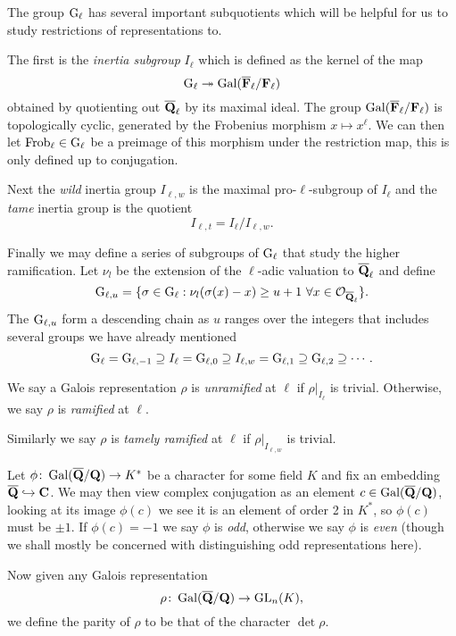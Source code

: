 \documentclass[a4paper,12pt]{article}
\begin{document}
The group $\mathrm{G}_\ell$ has several important subquotients which will be helpful for us to study restrictions of representations to.
\begin{defn}\label{def:inert}
The first is the \emph{inertia subgroup} $I_\ell$ which is defined as the kernel of the map
\[
\mathrm{G}_\ell \twoheadrightarrow \operatorname{Gal}(\overline{\mathbf{F}}_\ell/\mathbf{F}_\ell)
\]
obtained by quotienting out $\overline{\mathbf{Q}}_\ell$ by its maximal ideal.
The group $\operatorname{Gal}(\overline{\mathbf{F}}_\ell/\mathbf{F}_\ell)$ is topologically cyclic, generated by the Frobenius morphism $x \mapsto x^\ell$.
We can then let $\operatorname{Frob}_\ell\in \mathrm{G}_\ell$ be a preimage of this morphism under the restriction map, this is only defined up to conjugation.


Next the \emph{wild} inertia group $I_{\ell,w}$ is the maximal pro-$\ell$-subgroup of $I_\ell$ and the \emph{tame} inertia group is the quotient
\[
I_{\ell,t} = I_\ell / I_{\ell,w}.
\]

Finally we may define a series of subgroups of $\mathrm{G}_\ell$ that study the higher ramification.
Let $\nu_l$ be the extension of the $\ell$-adic valuation to $\overline{\mathbf{Q}}_\ell$ and define
\[
\mathrm{G}_{\ell,u} = \{\sigma \in \mathrm{G}_\ell : \nu_l(\sigma(x) - x) \ge u + 1\ \forall x \in \mathcal{O}_{\overline{\mathbf{Q}}_\ell} \}.
\]
The $\mathrm{G}_{\ell,u}$ form a descending chain as $u$ ranges over the integers that includes several groups we have already mentioned
\[
\mathrm{G}_\ell = \mathrm{G}_{\ell,-1} \supseteq I_\ell = \mathrm{G}_{\ell,0} \supseteq  I_{\ell,w} = \mathrm{G}_{\ell,1} \supseteq\mathrm{G}_{\ell, 2}\supseteq\cdots.
\]
\end{defn}

\begin{defn}
We say a Galois representation $\rho$ is \emph{unramified} at $\ell$ if $\rho|_{I_\ell}$ is trivial.
Otherwise, we say $\rho$ is \emph{ramified} at $\ell$.

Similarly we say $\rho$ is \emph{tamely ramified} at $\ell$ if $\rho|_{I_{\ell,w}}$ is trivial.
\end{defn}

\begin{defn}
Let $\phi\colon\operatorname{Gal}(\overline{\mathbf{Q}}/\mathbf{Q}) \to K^*$ be a character for some field $K$ and fix an embedding $\overline{\mathbf{Q}}\hookrightarrow \mathbf{C}$.
We may then view complex conjugation as an element $c\in \operatorname{Gal}(\overline{\mathbf{Q}}/\mathbf{Q})$, looking at its image $\phi(c)$ we see it is an element of order 2 in $K^*$, so $\phi(c)$ must be $\pm 1$.
If $\phi(c) = -1$ we say $\phi$ is \emph{odd}, otherwise we say $\phi$ is \emph{even} (though we shall mostly be concerned with distinguishing odd representations here).%

Now given any Galois representation
\[
\rho\colon\operatorname{Gal}(\overline{\mathbf{Q}}/\mathbf{Q}) \to \operatorname{GL}_n(K),
\]
we define the parity of $\rho$ to be that of the character $\det\rho$.
\end{defn}
\end{document}
